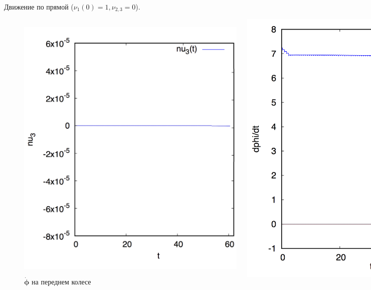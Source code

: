 \begin{frame}{Движение по прямой ($\nu_1(0) = 1, \nu_{2,3} = 0$).}
\begin{figure}[H]
\begin{columns}
                \vspace{-15pt}
                \caption{Траектория}
                \centering
                \includegraphics[width=0.8\linewidth]{content/pic/straight_60/nu3.png}
                \vspace{-15pt}
                \caption{Угловая скорость экипажа}
                \centering
                \includegraphics[width=0.8\linewidth]{content/pic/straight_60/nus1.png}
                \vspace{-15pt}
                \caption{$\dot{\mathbf{\phi}}$ на переднем колесе}
        \end{columns}
    \end{figure}
\end{frame}

